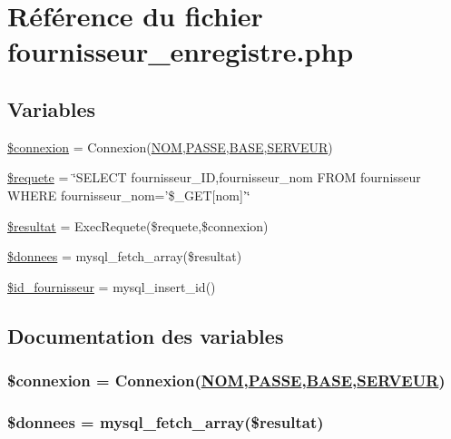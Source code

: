\hypertarget{fournisseur__enregistre_8php}{
\section{R\'{e}f\'{e}rence du fichier fournisseur\_\-enregistre.php}
\label{fournisseur__enregistre_8php}
}
\subsection*{Variables}
\begin{CompactItemize}
\item 
\hyperlink{fournisseur__enregistre_8php_a0}{\$connexion} = Connexion(\hyperlink{pma__connect_8php_a0}{NOM},\hyperlink{pma__connect_8php_a1}{PASSE},\hyperlink{pma__connect_8php_a3}{BASE},\hyperlink{pma__connect_8php_a2}{SERVEUR})
\item 
\hyperlink{fournisseur__enregistre_8php_a1}{\$requete} = \char`\"{}SELECT fournisseur\_\-ID,fournisseur\_\-nom FROM fournisseur WHERE fournisseur\_\-nom='\$\_\-GET\mbox{[}nom\mbox{]}'\char`\"{}
\item 
\hyperlink{fournisseur__enregistre_8php_a2}{\$resultat} = Exec\-Requete(\$requete,\$connexion)
\item 
\hyperlink{fournisseur__enregistre_8php_a3}{\$donnees} = mysql\_\-fetch\_\-array(\$resultat)
\item 
\hyperlink{fournisseur__enregistre_8php_a4}{\$id\_\-fournisseur} = mysql\_\-insert\_\-id()
\end{CompactItemize}


\subsection{Documentation des variables}
\hypertarget{fournisseur__enregistre_8php_a0}{
\subsubsection[\$connexion]{\setlength{\rightskip}{0pt plus 5cm}\$connexion = Connexion(\hyperlink{pma__connect_8php_a0}{NOM},\hyperlink{pma__connect_8php_a1}{PASSE},\hyperlink{pma__connect_8php_a3}{BASE},\hyperlink{pma__connect_8php_a2}{SERVEUR})}}
\label{fournisseur__enregistre_8php_a0}


\hypertarget{fournisseur__enregistre_8php_a3}{
\subsubsection[\$donnees]{\setlength{\rightskip}{0pt plus 5cm}\$donnees = mysql\_\-fetch\_\-array(\$resultat)}}
\label{fournisseur__enregistre_8php_a3}



